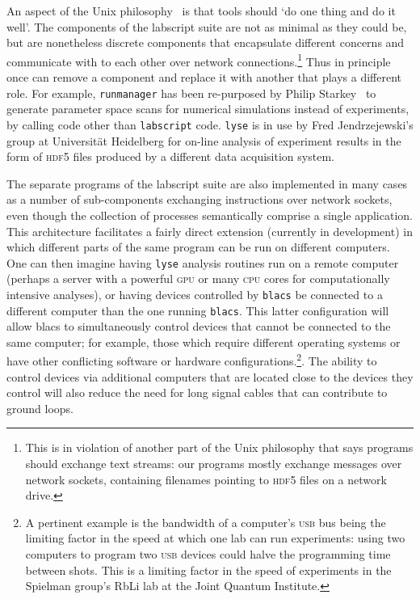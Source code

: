 An aspect of the Unix philosophy~\cite{gancarz_unix_1995} is that tools should `do one thing and do it well'. The components of the labscript suite are not as minimal as they could be, but are nonetheless discrete components that encapsulate different concerns and communicate with to each other over network connections.\footnote{This is in violation of another part of the Unix philosophy that says programs should exchange text streams: our programs mostly exchange messages over network sockets, containing filenames pointing to \textsc{hdf5} files on a network drive.} Thus in principle once can remove a component and replace it with another that plays a different role. For example, \texttt{runmanager} has been re-purposed by Philip Starkey~\cite{starkey_thesis_2018} to generate parameter space scans for numerical simulations instead of experiments, by calling code other than \texttt{labscript} code. \texttt{lyse} is in use by Fred Jendrzejewski's group at Universit\"at Heidelberg for on-line analysis of experiment results in the form of \textsc{hdf5} files produced by a different data acquisition system.

The separate programs of the labscript suite are also implemented in many cases as a number of sub-components exchanging instructions over network sockets, even though the collection of processes semantically comprise a single application. This architecture facilitates a fairly direct extension (currently in development) in which different parts of the same program can be run on different computers. One can then imagine having \texttt{lyse} analysis routines run on a remote computer (perhaps a server with a powerful \textsc{gpu} or many \textsc{cpu} cores for computationally intensive analyses), or having devices controlled by \texttt{blacs} be connected to a different computer than the one running \texttt{blacs}. This latter configuration will allow blacs to simultaneously control devices that cannot be connected to the same computer; for example, those which require different operating systems or have other conflicting software or hardware configurations.\footnote{A pertinent example is the bandwidth of a computer's \textsc{usb} bus being the limiting factor in the speed at which one lab can run experiments: using two computers to program two \textsc{usb} devices could halve the programming time between shots. This is a limiting factor in the speed of experiments in the Spielman group's RbLi lab at the Joint Quantum Institute.}. The ability to control devices via additional computers that are located close to the devices they control will also reduce the need for long signal cables that can contribute to ground loops.


